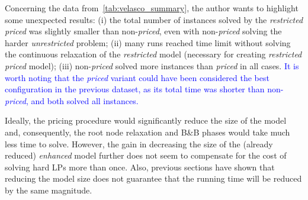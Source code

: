 \documentclass[ppgc,tese,english,formais,babel]{iiufrgs}
\newif\iffinalversion
\newcommand{\newtext}[1]{\iffinalversion%
#1%
\else%
\textcolor{blue}{#1}%
\fi%
}
\begin{document}
Concerning the data from~\cref{tab:velasco_summary}, the author wants to highlight some unexpected results:
(i) the total number of instances solved by the \emph{restricted priced} was slightly smaller than non-\emph{priced}, even with non-\emph{priced} solving the harder \emph{unrestricted} problem;
(ii) many runs reached time limit without solving the continuous relaxation of the \emph{restricted} model (necessary for creating \emph{restricted priced} model);
(iii) non-\emph{priced} solved more instances than \emph{priced} in all cases.
\newtext{It is worth noting that the \emph{priced} variant could have been considered the best configuration in the previous dataset, as its total time was shorter than non-\emph{priced}, and both solved all instances.}
Ideally, the pricing procedure would significantly reduce the size of the model and, consequently, the root node relaxation and B\&B phases would take much less time to solve.
However, the gain in decreasing the size of the (already reduced) \emph{enhanced} model further does not seem to compensate for the cost of solving hard LPs more than once.
Also, previous sections have shown that reducing the model size does not guarantee that the running time will be reduced by the same magnitude.
\end{document}
